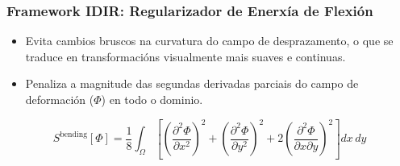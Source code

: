 \documentclass[xcolor=dvipsnames]{beamer}
\begin{document}
\begin{frame}
\frametitle{Framework IDIR: Regularizador de Enerxía de Flexión}

\begin{itemize}
    \item Evita cambios bruscos na curvatura do campo de desprazamento, o que se traduce en transformacións visualmente mais suaves e continuas.
    \vspace{0.3cm}
    \item Penaliza a magnitude das segundas derivadas parciais do campo de deformación ($\Phi$) en todo o dominio.
    \vspace{0.3cm}
\end{itemize}



\vfill %

\centering
$$
S^{\text{bending}}[\Phi] = \frac{1}{8} \int_{\Omega} \left[ \left( \frac{\partial^2 \Phi}{\partial x^2} \right)^2 + \left( \frac{\partial^2 \Phi}{\partial y^2} \right)^2 + 2 \left( \frac{\partial^2 \Phi}{\partial x \partial y} \right)^2 \right] dx \, dy
$$


\end{frame}
\end{document}
